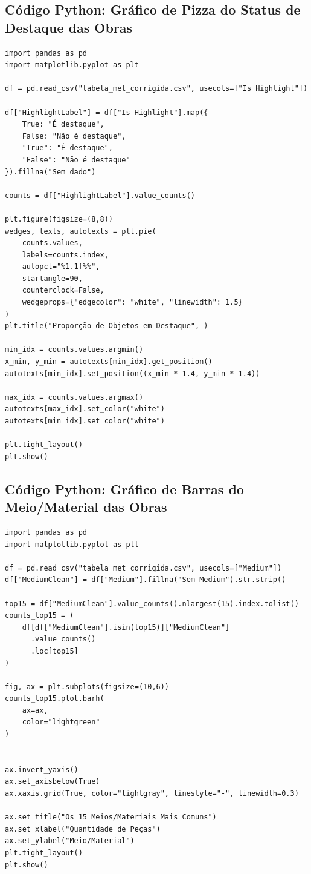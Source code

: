 \documentclass[11pt,a4paper]{article}
\begin{document}
\subsection*{Código Python: Gráfico de Pizza do Status de Destaque das Obras}
\label{anx:codigo_piechart_is_highlight}
\begin{verbatim}
import pandas as pd
import matplotlib.pyplot as plt

df = pd.read_csv("tabela_met_corrigida.csv", usecols=["Is Highlight"])

df["HighlightLabel"] = df["Is Highlight"].map({
    True: "É destaque",
    False: "Não é destaque",
    "True": "É destaque",
    "False": "Não é destaque"
}).fillna("Sem dado")

counts = df["HighlightLabel"].value_counts()

plt.figure(figsize=(8,8))
wedges, texts, autotexts = plt.pie(
    counts.values,
    labels=counts.index,
    autopct="%1.1f%%",
    startangle=90,
    counterclock=False,
    wedgeprops={"edgecolor": "white", "linewidth": 1.5}
)
plt.title("Proporção de Objetos em Destaque", )

min_idx = counts.values.argmin()
x_min, y_min = autotexts[min_idx].get_position()
autotexts[min_idx].set_position((x_min * 1.4, y_min * 1.4))

max_idx = counts.values.argmax()
autotexts[max_idx].set_color("white")
autotexts[min_idx].set_color("white")

plt.tight_layout()
plt.show()
\end{verbatim}

\subsection*{Código Python: Gráfico de Barras do Meio/Material das Obras}
\label{anx:codigo_barplot_medium}
\begin{verbatim}
import pandas as pd
import matplotlib.pyplot as plt

df = pd.read_csv("tabela_met_corrigida.csv", usecols=["Medium"])
df["MediumClean"] = df["Medium"].fillna("Sem Medium").str.strip()

top15 = df["MediumClean"].value_counts().nlargest(15).index.tolist()
counts_top15 = (
    df[df["MediumClean"].isin(top15)]["MediumClean"]
      .value_counts()
      .loc[top15]
)

fig, ax = plt.subplots(figsize=(10,6))
counts_top15.plot.barh(
    ax=ax,
    color="lightgreen"
)


ax.invert_yaxis()
ax.set_axisbelow(True)
ax.xaxis.grid(True, color="lightgray", linestyle="-", linewidth=0.3)

ax.set_title("Os 15 Meios/Materiais Mais Comuns")
ax.set_xlabel("Quantidade de Peças")
ax.set_ylabel("Meio/Material")
plt.tight_layout()
plt.show()
\end{verbatim}
\end{document}
